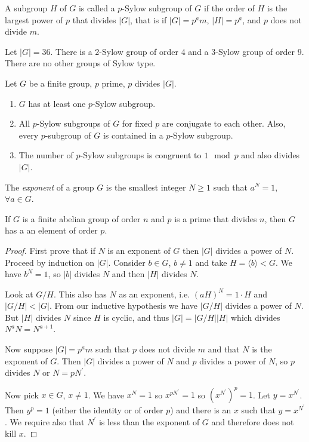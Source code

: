 \documentclass{article}
\begin{document}
\begin{defn}
A subgroup $H$ of $G$ is called a $p$-Sylow subgroup of $G$ if the
order of $H$ is the largest power of $p$ that divides $|G|$, that is
if $|G| = p^a m$, $|H| = p^a$, and $p$ does not divide $m$.
\end{defn}

\begin{xmpl}
Let $|G| = 36$. There is a 2-Sylow group of order 4 and a 3-Sylow
group of order 9. There are no other groups of Sylow type.
\end{xmpl}

\begin{theorem}
  Let $G$ be a finite group, $p$ prime, $p$ divides $|G|$.
  \begin{enumerate}
    \item{$G$ has at least one $p$-Sylow subgroup.
         }
    \item{All $p$-Sylow subgroups of $G$ for fixed $p$ are conjugate
          to each other. Also, every $p$-subgroup of $G$ is contained
          in a $p$-Sylow subgroup. 
         }
    \item{The number of $p$-Sylow subgroups is congruent to $1 \mod p$
          and also divides $|G|$.
         }
  \end{enumerate}
\end{theorem}

\begin{defn}
The \emph{exponent} of a group $G$ is the smallest integer $N \geq 1$
such that $a^N = 1,$ $\forall a \in G$.
\end{defn}

\begin{lemma}
If $G$ is a finite abelian group of order $n$ and $p$ is a prime that
divides $n$, then $G$ has a an element of order $p$.
\end{lemma}

\begin{proof}
First prove that if $N$ is an exponent of $G$ then $|G|$ divides a
power of $N$. Proceed by induction on $|G|$. Consider $b \in G$, $b
\neq 1$ and take $H = \langle b \rangle < G$. We have $b^N = 1$, so
$|b|$ divides $N$ and then $|H|$ divides $N$.

Look at $G / H$. This also has $N$ as an exponent, i.e.
$(aH)^N = 1 \cdot H$ and $|G / H| < |G|$. From our inductive
hypothesis we have $|G / H|$ divides a power of $N$. But
$|H|$ divides $N$ since $H$ is cyclic, and thus 
$|G| = |G / H| |H|$ which divides $N^a N = N^{a+1}$.

Now suppose $|G| = p^a m$ such that $p$ does not divide $m$
and that $N$ is the exponent of $G$. Then $|G|$ divides a power of $N$
and $p$ divides a power of $N$, so $p$ divides $N$ or $N = p
N^\prime$.

Now pick $x \in G$, $x \neq 1$. We have $x^N = 1$ so $x^{pN^\prime} =
1$ so $(x^{N^\prime})^p = 1$. Let $y = x^{N^\prime}$. Then $y^p = 1$
(either the identity or of order $p$) and there is an $x$ such that
$y = x^{N^\prime}$. We require also that $N^\prime$ is less than the
exponent of $G$ and therefore does not kill $x$.
\end{proof}
\end{document}
